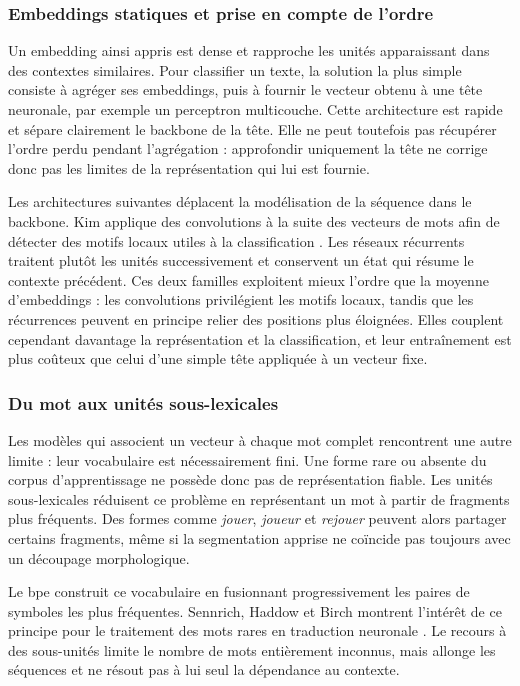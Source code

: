\subsubsection{Embeddings statiques et prise en compte de l'ordre}

Un embedding ainsi appris est dense et rapproche les unités apparaissant dans
des contextes similaires. Pour classifier un texte, la solution la plus simple
consiste à agréger ses embeddings, puis à fournir le vecteur obtenu à une tête
neuronale, par exemple un perceptron multicouche. Cette architecture est rapide
et sépare clairement le backbone de la tête. Elle ne peut toutefois pas
récupérer l'ordre perdu pendant l'agrégation : approfondir uniquement la tête ne
corrige donc pas les limites de la représentation qui lui est fournie.

Les architectures suivantes déplacent la modélisation de la séquence dans le
backbone. Kim applique des convolutions à la suite des vecteurs de mots afin de
détecter des motifs locaux utiles à la classification
\cite{kim2014cnn}. Les réseaux récurrents traitent plutôt les unités
successivement et conservent un état qui résume le contexte précédent. Ces deux
familles exploitent mieux l'ordre que la moyenne d'embeddings : les convolutions
privilégient les motifs locaux, tandis que les récurrences peuvent en principe
relier des positions plus éloignées. Elles couplent cependant davantage la
représentation et la classification, et leur entraînement est plus coûteux que
celui d'une simple tête appliquée à un vecteur fixe.

\subsubsection{Du mot aux unités sous-lexicales}

Les modèles qui associent un vecteur à chaque mot complet rencontrent une autre
limite : leur vocabulaire est nécessairement fini. Une forme rare ou absente du
corpus d'apprentissage ne possède donc pas de représentation fiable. Les unités
sous-lexicales réduisent ce problème en représentant un mot à partir de fragments
plus fréquents. Des formes comme \emph{jouer}, \emph{joueur} et \emph{rejouer}
peuvent alors partager certains fragments, même si la segmentation apprise ne
coïncide pas toujours avec un découpage morphologique.

Le \gls{bpe} construit ce vocabulaire en fusionnant progressivement les paires
de symboles les plus fréquentes. Sennrich, Haddow et Birch montrent l'intérêt de
ce principe pour le traitement des mots rares en traduction neuronale
\cite{sennrich2016subword}. Le recours à des sous-unités limite le nombre de
mots entièrement inconnus, mais allonge les séquences et ne résout pas à lui
seul la dépendance au contexte.


